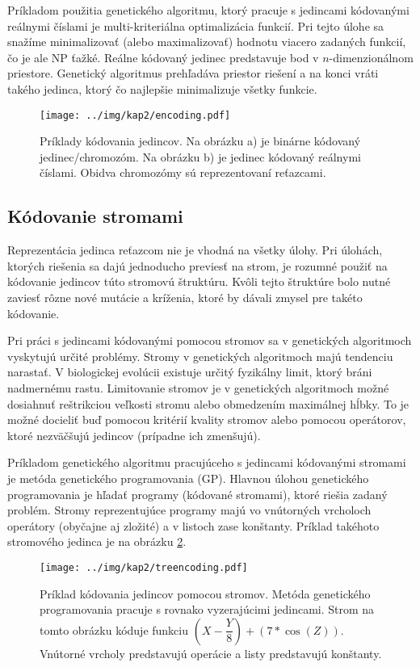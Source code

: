 Príkladom použitia genetického algoritmu, ktorý pracuje s jedincami kódovanými reálnymi číslami je multi-kriteriálna optimalizácia funkcií. Pri tejto úlohe sa snažíme minimalizovať (alebo maximalizovať) hodnotu viacero zadaných funkcií, čo je ale NP ťažké. Reálne kódovaný jedinec predstavuje bod v $n$-dimenzionálnom priestore. Genetický algoritmus prehľadáva priestor riešení a na konci vráti takého jedinca, ktorý čo najlepšie minimalizuje všetky funkcie.
\begin{figure}[h]
\centering
\centerline{\mbox{\texttt{[image: ../img/kap2/encoding.pdf]}}}
\caption{Príklady kódovania jedincov. Na obrázku a) je binárne kódovaný jedinec/chromozóm. Na obrázku b) je jedinec kódovaný reálnymi číslami. Obidva chromozómy sú reprezentovaní reťazcami.}\label{fig:Encoding}
\end{figure}

\subsection{Kódovanie stromami}\label{kap2:2.2:2.2.3:Tree}
Reprezentácia jedinca reťazcom nie je vhodná na všetky úlohy. Pri úlohách, ktorých riešenia sa dajú jednoducho previesť na strom, je rozumné použiť na kódovanie jedincov túto stromovú štruktúru. Kvôli tejto štruktúre bolo nutné zaviesť rôzne nové mutácie a kríženia, ktoré by dávali zmysel pre takéto kódovanie. 

Pri práci s jedincami kódovanými pomocou stromov sa v genetických algoritmoch vyskytujú určité problémy. Stromy v genetických algoritmoch majú tendenciu narastať. V biologickej evolúcii existuje určitý fyzikálny limit, ktorý bráni nadmernému rastu. Limitovanie stromov je v genetických algoritmoch možné dosiahnuť reštrikciou veľkosti stromu alebo obmedzením maximálnej hĺbky. To je možné docieliť buď pomocou kritérií kvality stromov alebo pomocou operátorov, ktoré nezväčšujú jedincov (prípadne ich zmenšujú).

Príkladom genetického algoritmu pracujúceho s jedincami kódovanými stromami je metóda genetického programovania (GP). Hlavnou úlohou genetického programovania je hľadať programy (kódované stromami), ktoré riešia zadaný problém. Stromy reprezentujúce programy majú vo vnútorných vrcholoch operátory (obyčajne aj zložité) a v listoch zase konštanty. Príklad takéhoto stromového jedinca je na obrázku \ref{fig:TreEncoding}.
\begin{figure}[h]
\centering
\centerline{\mbox{\texttt{[image: ../img/kap2/treencoding.pdf]}}}
\caption{Príklad kódovania jedincov pomocou stromov. Metóda genetického programovania pracuje s rovnako vyzerajúcimi jedincami. Strom na tomto obrázku kóduje funkciu $\left(X - \dfrac{Y}{8}\right) + \left(7 * \cos(Z)\right)$. Vnútorné vrcholy predstavujú operácie a listy predstavujú konštanty. }\label{fig:TreEncoding}
\end{figure}

